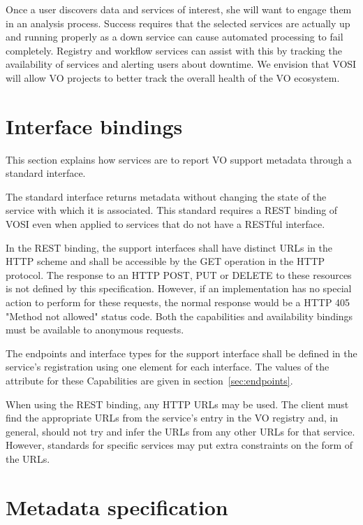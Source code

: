 \documentclass[11pt,letter]{ivoa}
\begin{document}
Once a user discovers data and services of interest, she will want to
engage them in an analysis process. Success requires that the selected
services are actually up and running properly as a down service can
cause automated processing to fail completely. Registry and workflow
services can assist with this by tracking the availability of services
and alerting users about downtime. We envision that VOSI will allow VO
projects to better track the overall health of the VO ecosystem. 

\section{Interface bindings}
\label{sec:bindings}

This section explains how services are to report VO support metadata
through a standard interface.

The standard interface returns metadata without changing the state of
the service with which it is associated. This standard requires a REST
binding of VOSI even when applied to services that do not have a RESTful
interface.

In the REST binding, the support interfaces shall have distinct URLs in
the HTTP scheme and shall be accessible by the GET operation in the HTTP
protocol. The response to an HTTP POST, PUT or DELETE to these resources
is not defined by this specification. However, if an implementation has
no special action to perform for these requests, the normal response
would be a HTTP 405 "Method not allowed" status code.  Both the
capabilities and availability bindings must be available to anonymous
requests.

The endpoints and interface types for the support interface shall be
defined in the service's registration using one 
element for each interface. The values of the 
attribute for these Capabilities are given in
section~\ref{sec:endpoints}.

When using the REST binding, any HTTP URLs may be used. The client must
find the appropriate URLs from the service's entry in the VO registry
and, in general, should not try and infer the URLs from any other URLs
for that service. However, standards for specific services may put extra
constraints on the form of the URLs.

\section{Metadata specification}
\label{sec:metadata}
\end{document}
